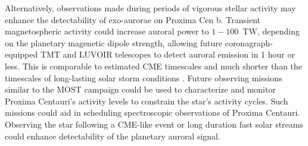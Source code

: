 \documentclass{emulateapj}
\newcommand{\xxx}[1]{{\color{red} #1}} %
\begin{document}
Alternatively, observations made during periods of vigorous stellar activity may enhance the detectability of exo-aurorae on Proxima Cen b.  Transient magnetospheric activity could increase auroral power to $1-100$~TW, depending on the planetary magenetic dipole strength, allowing future coronagraph-equipped TMT and LUVOIR telescopes to detect auroral emission in 1 hour or less. This is comparable to estimated CME timescales \citep{Khodachenko2007} and much shorter than the timescales of long-lasting solar storm conditions \citep{Gonzalez1994,Gonzalez1999}. Future observing missions similar to the MOST campaign \citep[e.g.][]{Davenport2016} could be used to characterize and monitor Proxima Centauri's activity levels to constrain the star's activity cycles. Such missions could aid in scheduling spectroscopic observations of Proxima Centauri. Observing the star following a CME-like event or long duration fast solar streams could enhance detectability of the planetary auroral signal.  



\end{document}
